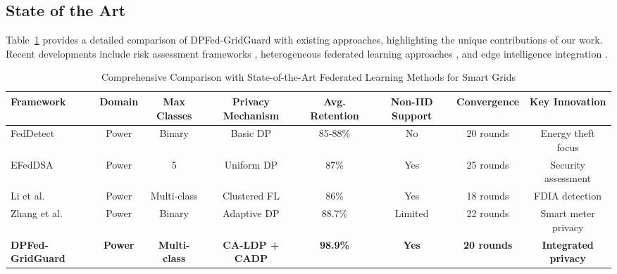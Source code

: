 \documentclass{ieeeaccess}
\theoremstyle{definition}
\begin{document}
\subsection{State of the Art}

Table~\ref{tab:sota_comparison} provides a detailed comparison of DPFed-GridGuard with existing approaches, highlighting the unique contributions of our work. Recent developments include risk assessment frameworks \cite{song2024data}, heterogeneous federated learning approaches \cite{zhao2024heterofl}, and edge intelligence integration \cite{chen2024introducing}.

\begin{table}[t]
\caption{Comprehensive Comparison with State-of-the-Art Federated Learning Methods for Smart Grids}
\label{tab:sota_comparison}
\centering
\begin{tabular}{lccccccc}
\toprule
Framework & Domain & Max Classes & Privacy Mechanism & Avg. Retention & Non-IID Support & Convergence & Key Innovation \\
\midrule
FedDetect \cite{wen2021feddetect} & Power & Binary & Basic DP & 85-88\% & No & 20 rounds & Energy theft focus \\
EFedDSA \cite{ren2023efeddsa} & Power & 5 & Uniform DP & 87\% & Yes & 25 rounds & Security assessment \\
Li et al. \cite{li2025clustered} & Power & Multi-class & Clustered FL & 86\% & Yes & 18 rounds & FDIA detection \\
Zhang et al. \cite{zhang2025dpck} & Power & Binary & Adaptive DP & 88.7\% & Limited & 22 rounds & Smart meter privacy \\
\textbf{DPFed-GridGuard} & \textbf{Power} & \textbf{Multi-class} & \textbf{CA-LDP + CADP} & \textbf{98.9\%} & \textbf{Yes} & \textbf{20 rounds} & \textbf{Integrated privacy} \\
\bottomrule
\end{tabular}
\end{table}
\end{document}
